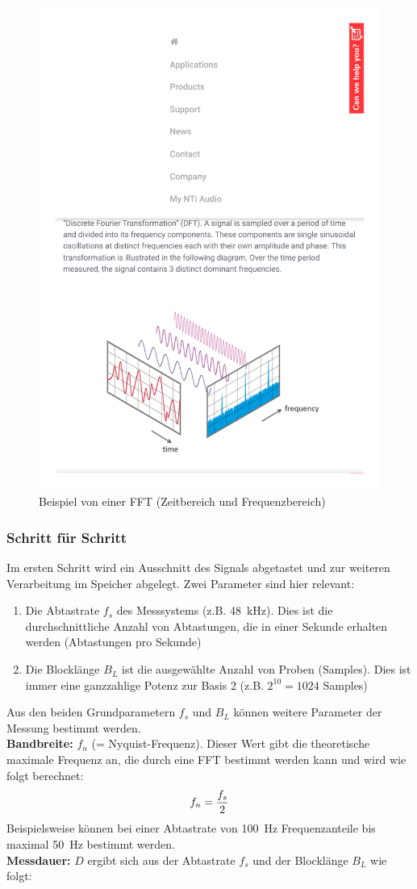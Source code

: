 \begin{figure}[htpb]
	\centering
	\includegraphics[width=0.5\linewidth]{Bilder/FFT_Bild_pdf_1.pdf}
	\caption{Beispiel von einer FFT (Zeitbereich und Frequenzbereich)\citep{NTIAudioFFT}}
	\label{fig:FFTBeispiel}
\end{figure}

\subsubsection{Schritt für Schritt}
Im ersten Schritt wird ein Ausschnitt des Signals abgetastet und zur weiteren Verarbeitung im Speicher abgelegt. Zwei Parameter sind hier relevant:
\begin{enumerate}
	\item Die Abtastrate $f_s$ des Messsystems (z.B. \SI{48}{\kilo\hertz}). Dies ist die durchschnittliche Anzahl von Abtastungen, die in einer Sekunde erhalten werden (Abtastungen pro Sekunde)
	\item Die Blocklänge $B_L$ ist die ausgewählte Anzahl von Proben (Samples). Dies ist immer eine ganzzahlige Potenz zur Basis 2 (z.B. $2^{10} = 1024$ Samples)
\end{enumerate}
Aus den beiden Grundparametern $f_s$ und $B_L$ können weitere Parameter der Messung bestimmt werden. \\
\textbf{Bandbreite:}  $f_n$ (= Nyquist-Frequenz). Dieser Wert gibt die theoretische maximale Frequenz an, die durch eine FFT bestimmt werden kann und wird wie folgt berechnet:
\begin{align}
	\centering
	f_n = \frac{f_s}{2}
	\label{gl:Nyquist-Frequenz}
\end{align}
Beispielsweise können bei einer Abtastrate von \SI{100}{\hertz} Frequenzanteile bis maximal \SI{50}{\hertz} bestimmt werden.\\
\textbf{Messdauer:} $D$ ergibt sich aus der Abtastrate $f_s$ und der Blocklänge $B_L$ wie folgt:

